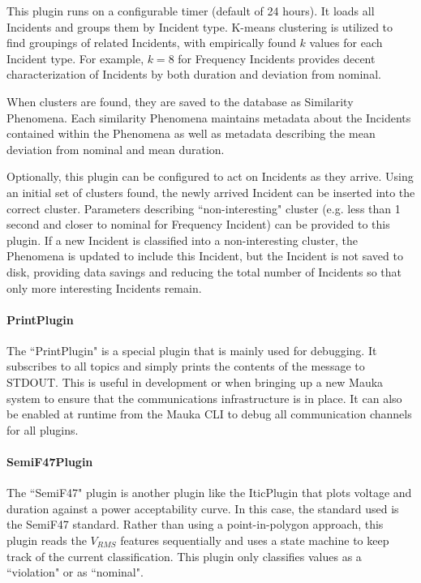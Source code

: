 This plugin runs on a configurable timer (default of 24 hours). It loads all Incidents and groups them by Incident type. K-means clustering is utilized to find groupings of related Incidents, with empirically found $k$ values for each Incident type. For example, $k=8$ for Frequency Incidents provides decent characterization of Incidents by both duration and deviation from nominal.

When clusters are found, they are saved to the database as Similarity Phenomena. Each similarity Phenomena maintains metadata about the Incidents contained within the Phenomena as well as metadata describing the mean deviation from nominal and mean duration.

Optionally, this plugin can be configured to act on Incidents as they arrive. Using an initial set of clusters found, the newly arrived Incident can be inserted into the correct cluster. Parameters describing ``non-interesting" cluster (e.g. less than 1 second and closer to nominal for Frequency Incident) can be provided to this plugin. If a new Incident is classified into a non-interesting cluster, the Phenomena is updated to include this Incident, but the Incident is not saved to disk, providing data savings and reducing the total number of Incidents so that only more interesting Incidents remain.

\paragraph{PrintPlugin}
The ``PrintPlugin" is a special plugin that is mainly used for debugging. It subscribes to all topics and simply prints the contents of the message to STDOUT. This is useful in development or when bringing up a new Mauka system to ensure that the communications infrastructure is in place. It can also be enabled at runtime from the Mauka CLI to debug all communication channels for all plugins.

\paragraph{SemiF47Plugin}
The ``SemiF47" plugin is another plugin like the IticPlugin that plots voltage and duration against a power acceptability curve. In this case, the standard used is the SemiF47 standard\cite{semif47}. Rather than using a point-in-polygon approach, this plugin reads the $V_{RMS}$ features sequentially and uses a state machine to keep track of the current classification. This plugin only classifies values as a ``violation" or as ``nominal".

